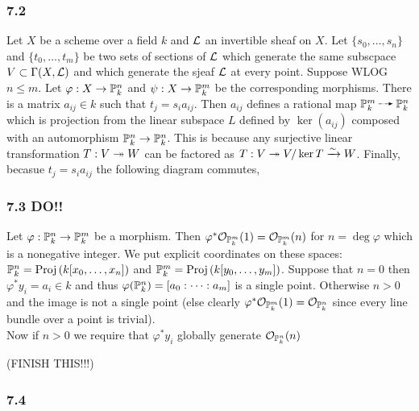 \documentclass[12pt]{article}
\begin{document}
\subsubsection{7.2}

Let $X$ be a scheme over a field $k$ and $\L$ an invertible sheaf on $X$. Let $\{ s_0, \dots, s_n \}$ and $\{ t_0, \dots, t_m \}$ be two sets of sections of $\L$ which generate the same subscpace $V \subset \Gamma(X, \L)$ and which generate the sjeaf $\L$ at every point. Suppose WLOG $n \le m$. Let $\varphi : X \to \P^n_k$ and $\psi : X \to \P^m_k$ be the corresponding morphisms. There is a matrix $a_{ij} \in k$ such that $t_j = s_i a_{ij}$. Then $a_{ij}$ defines a rational map $\P^m_k \rat \P^n_k$ which is projection from the linear subspace $L$ defined by $\ker{(a_{ij})}$ composed with an automorphism $\P^n_k \to \P^n_k$. This is because any surjective linear transformation $T : V \onto W$ can be factored as $T : V \onto V/\ker{T} \iso W$. Finally, becasue $t_j = s_i a_{ij}$ the following diagram commutes,
\begin{center}
\end{center}

\subsubsection{7.3 DO!!}

Let $\varphi : \P^n_k \to \P^m_k$ be a morphism. Then $\varphi^* \struct{\P^m_k}(1) = \struct{\P^m_k}(n)$ for $n = \deg{\varphi}$ which is a nonegative integer. We put explicit coordinates on these spaces: $\P^n_k = \Proj{k[x_0, \dots, x_n]}$ and $\P^m_k = \Proj{k[y_0, \dots, y_m]}$. Suppose that $n = 0$ then $\varphi^* y_i = a_i \in k$ and thus $\varphi(\P^n_k) = [a_0 : \cdots : a_m]$ is a single point. Otherwise $n > 0$ and the image is not a single point (else clearly $\varphi^* \struct{\P^m_k}(1) = \struct{\P^n_k}$ since every line bundle over a point is trivial). 
\bigskip\\
Now if $n > 0$ we require that $\varphi^* y_i$ globally generate $\struct{\P^n_k}(n)$ 

(FINISH THIS!!!)

\subsubsection{7.4}
\end{document}
